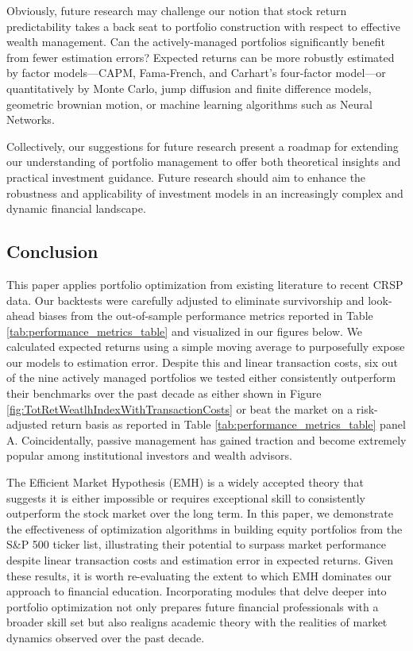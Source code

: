\documentclass[12pt,letterpaper]{article}
\begin{document}
Obviously, future research may challenge our notion that stock return predictability takes a back seat to portfolio construction with respect to effective wealth management. Can the actively-managed portfolios significantly benefit from fewer estimation errors? Expected returns can be more robustly estimated by factor models---CAPM, Fama-French, and Carhart's four-factor model---or quantitatively by Monte Carlo, jump diffusion and finite difference models, geometric brownian motion, or machine learning algorithms such as Neural Networks.

Collectively, our suggestions for future research present a roadmap for extending our understanding of portfolio management to offer both theoretical insights and practical investment guidance. Future research should aim to enhance the robustness and applicability of investment models in an increasingly complex and dynamic financial landscape.

\clearpage

\subsection{Conclusion}

This paper applies portfolio optimization from existing literature to recent CRSP data. Our backtests were carefully adjusted to eliminate survivorship and look-ahead biases from the out-of-sample performance metrics reported in Table \ref{tab:performance_metrics_table} and visualized in our figures below. We calculated expected returns using a simple moving average to purposefully expose our models to estimation error. Despite this and linear transaction costs, six out of the nine actively managed portfolios we tested either consistently outperform their benchmarks over the past decade as either shown in Figure \ref{fig:TotRetWeatlhIndexWithTransactionCosts} or beat the market on a risk-adjusted return basis as reported in Table \ref{tab:performance_metrics_table} panel A. Coincidentally, passive management has gained traction and become extremely popular among institutional investors and wealth advisors.

The Efficient Market Hypothesis (EMH) is a widely accepted theory that suggests it is either impossible or requires exceptional skill to consistently outperform the stock market over the long term. In this paper, we demonstrate the effectiveness of optimization algorithms in building equity portfolios from the S\&P 500 ticker list, illustrating their potential to surpass market performance despite linear transaction costs and estimation error in expected returns. Given these results, it is worth re-evaluating the extent to which EMH dominates our approach to financial education. Incorporating modules that delve deeper into portfolio optimization not only prepares future financial professionals with a broader skill set but also realigns academic theory with the realities of market dynamics observed over the past decade.
    
\end{document}
